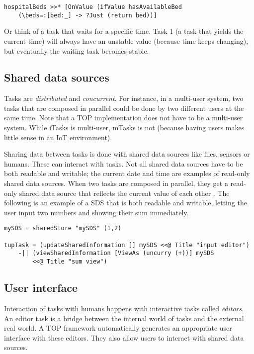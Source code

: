\medskip
\begin{verbatim}
hospitalBeds >>* [OnValue (ifValue hasAvailableBed
    (\beds=:[bed:_] -> ?Just (return bed))]
\end{verbatim}

Or think of a task that waits for a specific time. Task 1 (a task that yields the current time) will always have an unstable value (because time keeps changing), but eventually the waiting task becomes stable.

\subsection{Shared data sources}\label{section-top-sds}
Tasks are \textit{distributed} and \textit{concurrent}. For instance, in a multi-user system, two tasks that are composed in parallel could be done by two different users at the same time. Note that a TOP implementation does not have to be a multi-user system. While iTasks is multi-user, mTasks is not (because having users makes little sense in an IoT environment).

Sharing data between tasks is done with shared data sources like files, sensors or humans. These can interact with tasks. Not all shared data sources have to be both readable and writable; the current date and time are examples of read-only shared data sources.
When two tasks are composed in parallel, they get a read-only shared data source that reflects the current value of each other \cite[\S 2.1]{plasmeijer2012task}. The following is an example of a SDS that is both readable and writable, letting the user input two numbers and showing their sum immediately.

\medskip
\begin{verbatim}
mySDS = sharedStore "mySDS" (1,2)

tupTask = (updateSharedInformation [] mySDS <<@ Title "input editor")
    -|| (viewSharedInformation [ViewAs (uncurry (+))] mySDS
        <<@ Title "sum view")
\end{verbatim}

\subsection{User interface}
Interaction of tasks with humans happens with interactive tasks called \textit{editors}. An editor task is a bridge between the internal world of tasks and the external real world.
A TOP framework automatically generates an appropriate user interface with these editors. They also allow users to interact with shared data sources.

